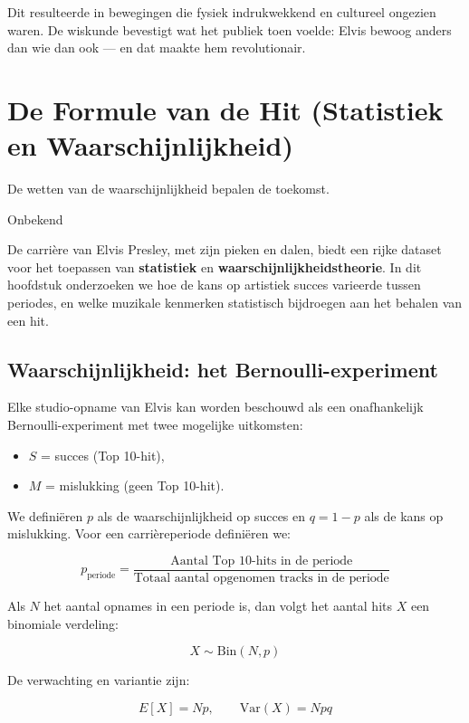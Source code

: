 \documentclass{book}
\begin{document}
	Dit resulteerde in bewegingen die fysiek indrukwekkend en cultureel ongezien waren.  
	De wiskunde bevestigt wat het publiek toen voelde: Elvis bewoog anders dan wie dan ook --- 
	en dat maakte hem revolutionair.
	
	\chapter{De Formule van de Hit (Statistiek en Waarschijnlijkheid)}
	\label{chap:statistiek}
	
	\epigraph{De wetten van de waarschijnlijkheid bepalen de toekomst.}{Onbekend}
	
	De carri\`ere van Elvis Presley, met zijn pieken en dalen, biedt een rijke dataset voor het toepassen van 
	\textbf{statistiek} en \textbf{waarschijnlijkheidstheorie}. In dit hoofdstuk onderzoeken we hoe de kans op 
	artistiek succes varieerde tussen periodes, en welke muzikale kenmerken statistisch bijdroegen aan het behalen 
	van een hit.
	
	\section{Waarschijnlijkheid: het Bernoulli-experiment}
	
	Elke studio-opname van Elvis kan worden beschouwd als een onafhankelijk Bernoulli-experiment met twee mogelijke 
	uitkomsten:
	
	\begin{itemize}
		\item $S$ = succes (Top 10-hit),
		\item $M$ = mislukking (geen Top 10-hit).
	\end{itemize}
	
	We defini\"eren $p$ als de waarschijnlijkheid op succes en $q = 1 - p$ als de kans op mislukking. 
	Voor een carri\`ereperiode defini\"eren we:
	
	\[
	p_{\text{periode}} = 
	\frac{\text{Aantal Top 10-hits in de periode}}{\text{Totaal aantal opgenomen tracks in de periode}}
	\]
	
	Als $N$ het aantal opnames in een periode is, dan volgt het aantal hits $X$ een binomiale verdeling:
	
	\[
	X \sim \mathrm{Bin}(N, p)
	\]
	
	De verwachting en variantie zijn:
	
	\[
	E[X] = Np,
	\qquad
	\mathrm{Var}(X) = Npq
	\]
	
\end{document}

